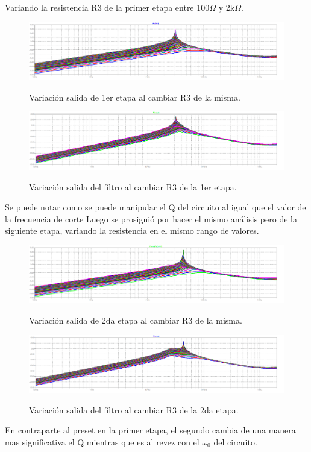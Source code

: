 Variando la resistencia R3 de la primer etapa entre 100$\Omega$ y 2k$\Omega$.  
\begin{figure}[H]
	\centering
	\includegraphics[width=\textwidth]{Imagenes-Ej2/presetE1.png}
	\label{fig:graph}
	\caption{Variación salida de 1er etapa al cambiar R3 de la misma.}
\end{figure}
\begin{figure}[H]
	\centering
	\includegraphics[width=\textwidth]{Imagenes-Ej2/presetEFE1.png}
	\label{fig:graph}
	\caption{Variación salida del filtro al cambiar R3 de la 1er etapa.}
\end{figure}
Se puede notar como se puede manipular el Q del circuito al igual que el valor de la frecuencia de corte
Luego se prosiguió por hacer el mismo análisis pero de la siguiente etapa, variando la resistencia en el mismo rango de valores.
\begin{figure}[H]
	\centering
	\includegraphics[width=\textwidth]{Imagenes-Ej2/presetE2.png}
	\label{fig:graph}
	\caption{Variación salida de 2da etapa al cambiar R3 de la misma.}
\end{figure}
\begin{figure}[H]
	\centering
	\includegraphics[width=\textwidth]{Imagenes-Ej2/presetEFE2.png}
	\label{fig:graph}
	\caption{Variación salida del filtro al cambiar R3 de la 2da etapa.}
\end{figure}
En contraparte al preset en la primer etapa, el segundo cambia de una manera mas significativa el Q mientras que es al revez con el $\omega_0$ del circuito.


